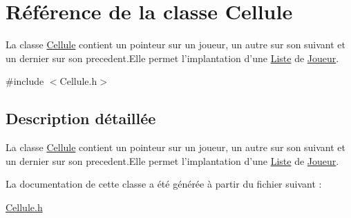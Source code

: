\hypertarget{class_cellule}{\section{\-Référence de la classe \-Cellule}
\label{class_cellule}
}


\-La classe \hyperlink{class_cellule}{\-Cellule} contient un pointeur sur un joueur, un autre sur son suivant et un dernier sur son precedent.\-Elle permet l'implantation d'une \hyperlink{class_liste}{\-Liste} de \hyperlink{class_joueur}{\-Joueur}.  




{\ttfamily \#include $<$\-Cellule.\-h$>$}



\subsection{\-Description détaillée}
\-La classe \hyperlink{class_cellule}{\-Cellule} contient un pointeur sur un joueur, un autre sur son suivant et un dernier sur son precedent.\-Elle permet l'implantation d'une \hyperlink{class_liste}{\-Liste} de \hyperlink{class_joueur}{\-Joueur}. 

\-La documentation de cette classe a été générée à partir du fichier suivant \-:\begin{DoxyCompactItemize}
\item 
\hyperlink{_cellule_8h}{\-Cellule.\-h}\end{DoxyCompactItemize}
